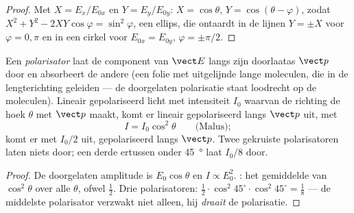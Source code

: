 \begin{proof}
Met $X = E_x/E_{0x}$ en $Y = E_y/E_{0y}$: $X = \cos\theta$,
$Y = \cos(\theta - \varphi)$, zodat
$X^2 + Y^2 - 2XY\cos\varphi = \sin^2\varphi$, een ellips, die ontaardt in de
lijnen $Y = \pm X$ voor $\varphi = 0, \pi$ en in een cirkel voor
$E_{0x} = E_{0y}$, $\varphi = \pm\pi/2$.
\end{proof}

\begin{proposition}\label{prop:b2:plane-waves-polarization:malus}
Een \emph{polarisator} laat de component van $\vect E$ langs zijn doorlaatas
$\vect p$ door en absorbeert de andere (een folie met uitgelijnde lange
moleculen, die in de lengterichting geleiden --- de doorgelaten polarisatie
staat loodrecht op de moleculen). Lineair gepolariseerd licht met
intensiteit $I_0$ waarvan de richting de hoek $\theta$ met $\vect p$ maakt,
komt er lineair gepolariseerd langs $\vect p$ uit, met
\[
I = I_0\cos^2\theta \qquad\text{(Malus)} ;
\]
 komt er met $I_0/2$ uit, gepolariseerd langs $\vect p$.
Twee gekruiste polarisatoren laten niets door; een derde ertussen onder
\qty{45}{\degree} laat $I_0/8$ door.
\end{proposition}

\begin{proof}
De doorgelaten amplitude is $E_0\cos\theta$ en $I \propto E_0^2$. : het gemiddelde van $\cos^2\theta$ over alle $\theta$, ofwel
$\tfrac12$. Drie polarisatoren:
$\tfrac12\cdot\cos^2 45^\circ\cdot\cos^2 45^\circ = \tfrac18$ --- de
middelste polarisator verzwakt niet alleen, hij \emph{draait} de
polarisatie.
\end{proof}

